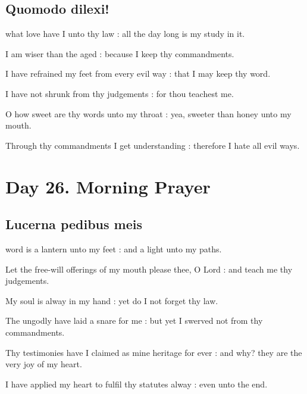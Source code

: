 \subsection{Quomodo dilexi!}
 what love have I unto thy law : all the day long is my study in it.\par
{}
I am wiser than the aged : because I keep thy commandments.\par
{}I have refrained my feet from every evil way : that I may keep thy word.\par
{}I have not shrunk from thy judgements : for thou teachest me.\par
{}O how sweet are thy words unto my throat : yea, sweeter than honey unto my mouth.\par
{}Through thy commandments I get understanding : therefore I hate all evil ways.\par

\clearpage
\section*{Day 26. Morning Prayer}

\subsection{Lucerna pedibus meis}
 word is a lantern unto my feet : and a light unto my paths.\par
{}
Let the free-will offerings of my mouth please thee, O Lord : and teach me thy judgements.\par
{}My soul is alway in my hand : yet do I not forget thy law.\par
{}The ungodly have laid a snare for me : but yet I swerved not from thy commandments.\par
{}Thy testimonies have I claimed as mine heritage for ever : and why? they are the very joy of my heart.\par
{}I have applied my heart to fulfil thy statutes alway : even unto the end.\par

